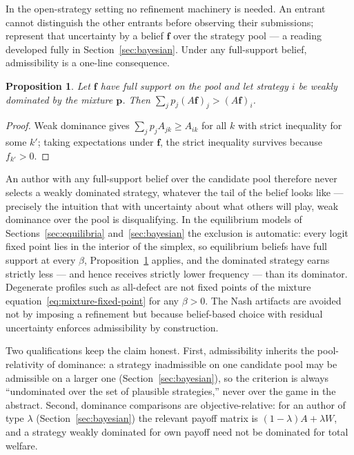 \documentclass[11pt]{article}
\newtheorem{proposition}{Proposition}
\begin{document}
In the open-strategy setting no refinement machinery is needed.
An entrant cannot distinguish the other entrants before observing
their submissions; represent that uncertainty by a belief
$\mathbf{f}$ over the strategy pool --- a reading developed fully in
Section~\ref{sec:bayesian}.
Under any full-support belief, admissibility is a one-line
consequence.

\begin{proposition}
\label{prop:admissibility}
Let $\mathbf{f}$ have full support on the pool and let strategy $i$ be
weakly dominated by the mixture $\mathbf{p}$.
Then $\sum_j p_j (A\mathbf{f})_j > (A\mathbf{f})_i$.
\end{proposition}

\begin{proof}
Weak dominance gives $\sum_j p_j A_{jk} \ge A_{ik}$ for all $k$ with
strict inequality for some $k'$; taking expectations under
$\mathbf{f}$, the strict inequality survives because $f_{k'} > 0$.
\end{proof}

An author with any full-support belief over the candidate pool
therefore never selects a weakly dominated strategy, whatever the tail
of the belief looks like --- precisely the intuition that with
uncertainty about what others will play, weak dominance over the
pool is disqualifying.
In the equilibrium models of
Sections~\ref{sec:equilibria} and~\ref{sec:bayesian} the exclusion is
automatic: every logit fixed point lies in the interior of the
simplex, so equilibrium beliefs have full support at every $\beta$,
Proposition~\ref{prop:admissibility} applies, and the dominated
strategy earns strictly less --- and hence receives strictly lower
frequency --- than its dominator.
Degenerate profiles such as all-defect are not fixed points of the
mixture equation~\eqref{eq:mixture-fixed-point} for any $\beta > 0$.
The Nash artifacts are avoided not by imposing a refinement but
because belief-based choice with residual uncertainty enforces
admissibility by construction.

Two qualifications keep the claim honest.
First, admissibility inherits the pool-relativity of dominance: a
strategy inadmissible on one candidate pool may be admissible on a
larger one (Section~\ref{sec:bayesian}), so the criterion is always
``undominated over the set of plausible strategies,'' never over the
game in the abstract.
Second, dominance comparisons are objective-relative: for an author of
type $\lambda$ (Section~\ref{sec:bayesian}) the relevant payoff
matrix is $(1-\lambda)A + \lambda W$, and a strategy weakly dominated
for own payoff need not be dominated for total welfare.
\end{document}
